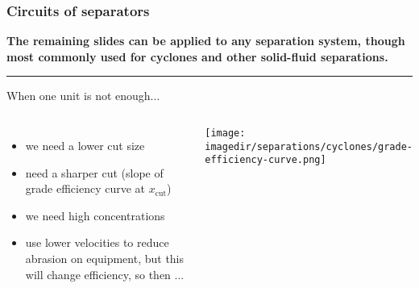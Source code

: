 

% 



\begin{frame}\frametitle{Circuits of separators}
	{\scriptsize \textbf{The remaining slides can be applied to any separation system, though most commonly used for cyclones and other solid-fluid separations.}}
	\vspace{12pt}
	\hrule
	\vspace{6pt}
	When one unit is not enough...
	\begin{columns}[t]
			\begin{itemize}
				\item	we need a lower cut size
				\item	need a sharper cut (slope of grade efficiency curve at $x_\text{cut}$)
				\item	we need high concentrations
				\item	use lower velocities to reduce abrasion on equipment, but this will change efficiency, so then ...
			\end{itemize}
			\begin{center}
				\texttt{[image: \\imagedir/separations/cyclones/grade-efficiency-curve.png]}
			\end{center}
	\end{columns}
	\vspace{24pt}
\end{frame}

